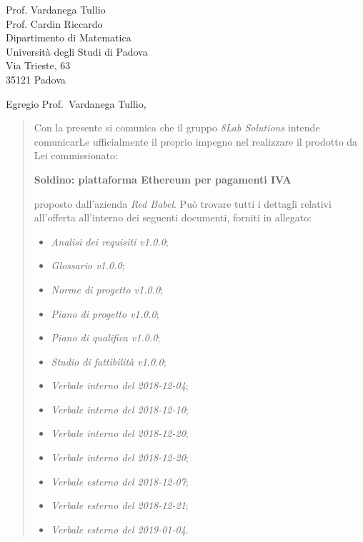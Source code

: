 \begin{letter}{
		Prof. Vardanega Tullio \\
		Prof. Cardin Riccardo \\
		Dipartimento di Matematica \\
		Università degli Studi di Padova \\
		Via Trieste, 63 \\
		35121 Padova}
		
\opening{Egregio Prof.~Vardanega Tullio,}

\begin{quotation}
Con la presente si comunica che il gruppo \textit{8Lab Solutions} intende 
comunicarLe ufficialmente il proprio impegno nel realizzare il prodotto da Lei 
commissionato:

\begin{center}
	\textbf{Soldino: piattaforma Ethereum per pagamenti IVA}
\end{center}

\noindent proposto dall'azienda \textit{Red Babel}.
Può trovare tutti i dettagli relativi all'offerta all'interno dei seguenti 
documenti, forniti in allegato:

\begin{itemize}
	\item \textit{Analisi dei requisiti v1.0.0};
	
	\item \textit{Glossario v1.0.0};
	
	\item \textit{Norme di progetto v1.0.0};

	\item \textit{Piano di progetto v1.0.0};

	\item \textit{Piano di qualifica v1.0.0};

	\item \textit{Studio di fattibilità v1.0.0};

	\item \textit{Verbale interno del 2018-12-04};
	\item \textit{Verbale interno del 2018-12-10};
	\item \textit{Verbale interno del 2018-12-20};
	\item \textit{Verbale interno del 2018-12-20};
	
	\item \textit{Verbale esterno del 2018-12-07};
	\item \textit{Verbale esterno del 2018-12-21};
	\item \textit{Verbale esterno del 2019-01-04}.
\end{itemize}


\end{quotation}
\end{letter}
